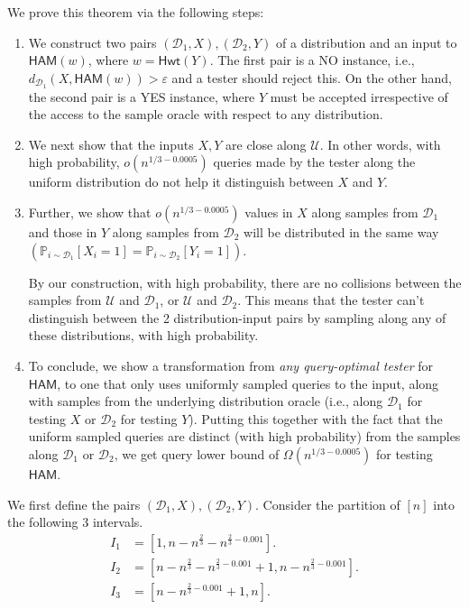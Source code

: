 \documentclass[11pt]{article}
\newcommand{\Hamming}{\mathsf{Hwt}}
\newcommand{\HAM}{\mathsf{HAM}}
\newcommand{\sU}{\mathcal{U}}
\newcommand{\sD}{\mathcal{D}}
\begin{document}
We prove this theorem via the following steps:
\begin{enumerate}
    \item We construct two pairs $(\mathcal{D}_{1}, X),(\mathcal{D}_{2}, Y)$ of a distribution and an input to $\HAM(w)$, where $w = \Hamming(Y)$. 
    The first pair is a NO instance, i.e., $d_{\mathcal{D}_{1}}(X, \HAM(w))>\varepsilon$ and a tester should reject this. On the other hand, the second pair is a YES instance, where $Y$ must be accepted irrespective of the access to the sample oracle with respect to any distribution. 
    
    \item We next show that the inputs $X,Y$ are close along $\sU$. In other words, with high probability, $o(n^{1/3-0.0005})$ queries made by the tester along the uniform distribution do not help it distinguish between $X$ and $Y$.
    
    \item Further, we show that $o(n^{1/3-0.0005})$ values in $X$ along samples from $\mathcal{D}_{1}$ and those in $Y$ along samples from $\mathcal{D}_{2}$ will be distributed in the same way $(\mathbb{P}_{i\sim \mathcal{D}_{1}}\left [X_{i}=1\right]=\mathbb{P}_{i\sim \mathcal{D}_{2}}\left [Y_{i}=1\right])$. 
    
    By our construction, with high probability, there are no collisions between the samples from $\sU$ and $\sD_1$, or $\sU$ and $\sD_2$. This means that the tester can't distinguish between the 2 distribution-input pairs by sampling along any of these distributions, with high probability. 
    
    \item To conclude, we show a transformation from \textit{any query-optimal tester} for $\HAM$, to one that only uses uniformly sampled queries to the input, along with samples from the underlying distribution oracle (i.e., along $\sD_{1}$ for testing $X$ or $\sD_{2}$ for testing $Y$). 
    Putting this together with the fact that the uniform sampled queries are distinct (with high probability) from the samples along $\sD_1$ or $\sD_2$, we get query lower bound of $\Omega(n^{1/3-0.0005})$ for testing $\HAM$.
\end{enumerate}
    
We first define the pairs $(\mathcal{D}_{1}, X),(\mathcal{D}_{2}, Y)$. Consider the partition of $[n]$ into the following 3 intervals. 
\[
\begin{split}
I_{1}&=[1,n-n^{\frac{2}{3}}-n^{\frac{2}{3}-0.001}].\\ I_{2}&=[n-n^{\frac{2}{3}}-n^{\frac{2}{3}-0.001}+1, n-n^{\frac{2}{3}-0.001}].\\ I_{3}&=[n-n^{\frac{2}{3}-0.001}+1,n].
\end{split}
\]
\end{document}
